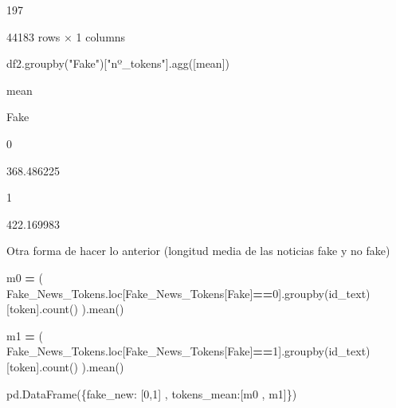 \documentclass[
  11pt,
  a4paper,
]{article}
\newenvironment{Shaded}{\begin{snugshade}}{\end{snugshade}}
\newcommand{\DecValTok}[1]{\textcolor[rgb]{0.00,0.00,0.81}{#1}}
\newcommand{\NormalTok}[1]{#1}
\newcommand{\OperatorTok}[1]{\textcolor[rgb]{0.81,0.36,0.00}{\textbf{#1}}}
\newcommand{\StringTok}[1]{\textcolor[rgb]{0.31,0.60,0.02}{#1}}
\begin{document}
197

44183 rows × 1 columns

\begin{Shaded}
\begin{Highlighting}[]
\NormalTok{df2.groupby(}\StringTok{"Fake"}\NormalTok{)[}\StringTok{"nº\_tokens"}\NormalTok{].agg([}\StringTok{\textquotesingle{}mean\textquotesingle{}}\NormalTok{])}
\end{Highlighting}
\end{Shaded}

mean

Fake

0

368.486225

1

422.169983

Otra forma de hacer lo anterior (longitud media de las noticias fake y
no fake)

\begin{Shaded}
\begin{Highlighting}[]
\NormalTok{m0 }\OperatorTok{=}\NormalTok{ ( Fake\_News\_Tokens.loc[Fake\_News\_Tokens[}\StringTok{\textquotesingle{}Fake\textquotesingle{}}\NormalTok{]}\OperatorTok{==}\DecValTok{0}\NormalTok{].groupby(}\StringTok{\textquotesingle{}id\_text\textquotesingle{}}\NormalTok{)[}\StringTok{\textquotesingle{}token\textquotesingle{}}\NormalTok{].count() ).mean()}
\end{Highlighting}
\end{Shaded}

\begin{Shaded}
\begin{Highlighting}[]
\NormalTok{m1 }\OperatorTok{=}\NormalTok{ ( Fake\_News\_Tokens.loc[Fake\_News\_Tokens[}\StringTok{\textquotesingle{}Fake\textquotesingle{}}\NormalTok{]}\OperatorTok{==}\DecValTok{1}\NormalTok{].groupby(}\StringTok{\textquotesingle{}id\_text\textquotesingle{}}\NormalTok{)[}\StringTok{\textquotesingle{}token\textquotesingle{}}\NormalTok{].count() ).mean()}
\end{Highlighting}
\end{Shaded}

\begin{Shaded}
\begin{Highlighting}[]
\NormalTok{pd.DataFrame(\{}\StringTok{\textquotesingle{}fake\_new\textquotesingle{}}\NormalTok{: [}\DecValTok{0}\NormalTok{,}\DecValTok{1}\NormalTok{] , }\StringTok{\textquotesingle{}tokens\_mean\textquotesingle{}}\NormalTok{:[m0 , m1]\})}
\end{Highlighting}
\end{Shaded}
\end{document}
